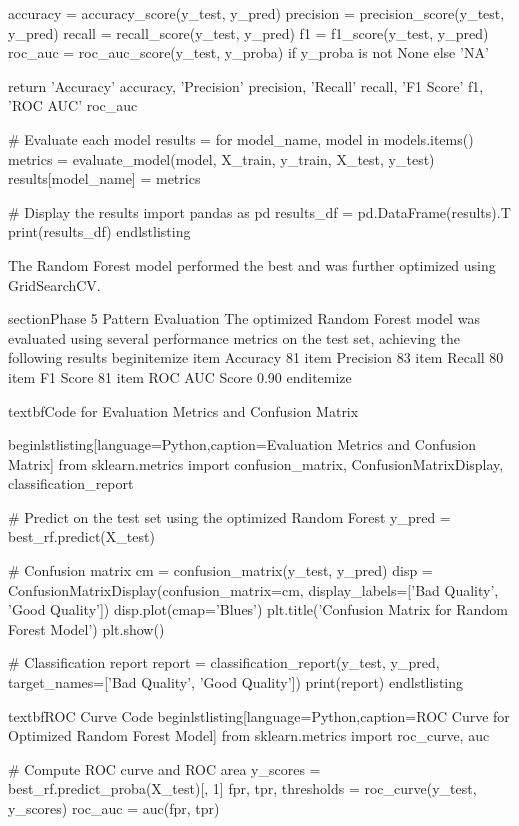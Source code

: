     accuracy = accuracy_score(y_test, y_pred)
    precision = precision_score(y_test, y_pred)
    recall = recall_score(y_test, y_pred)
    f1 = f1_score(y_test, y_pred)
    roc_auc = roc_auc_score(y_test, y_proba) if y_proba is not None else 'NA'

    return {
        'Accuracy' accuracy,
        'Precision' precision,
        'Recall' recall,
        'F1 Score' f1,
        'ROC AUC' roc_auc
    }

# Evaluate each model
results = {}
for model_name, model in models.items()
    metrics = evaluate_model(model, X_train, y_train, X_test, y_test)
    results[model_name] = metrics

# Display the results
import pandas as pd
results_df = pd.DataFrame(results).T
print(results_df)
end{lstlisting}

The Random Forest model performed the best and was further optimized using GridSearchCV.

section{Phase 5 Pattern Evaluation}
The optimized Random Forest model was evaluated using several performance metrics on the test set, achieving the following results
begin{itemize}
    item Accuracy 81%
    item Precision 83%
    item Recall 80%
    item F1 Score 81%
    item ROC AUC Score 0.90
end{itemize}

textbf{Code for Evaluation Metrics and Confusion Matrix}

begin{lstlisting}[language=Python,caption=Evaluation Metrics and Confusion Matrix]
from sklearn.metrics import confusion_matrix, ConfusionMatrixDisplay, classification_report

# Predict on the test set using the optimized Random Forest
y_pred = best_rf.predict(X_test)

# Confusion matrix
cm = confusion_matrix(y_test, y_pred)
disp = ConfusionMatrixDisplay(confusion_matrix=cm, display_labels=['Bad Quality', 'Good Quality'])
disp.plot(cmap='Blues')
plt.title('Confusion Matrix for Random Forest Model')
plt.show()

# Classification report
report = classification_report(y_test, y_pred, target_names=['Bad Quality', 'Good Quality'])
print(report)
end{lstlisting}

textbf{ROC Curve Code}
begin{lstlisting}[language=Python,caption=ROC Curve for Optimized Random Forest Model]
from sklearn.metrics import roc_curve, auc

# Compute ROC curve and ROC area
y_scores = best_rf.predict_proba(X_test)[, 1]
fpr, tpr, thresholds = roc_curve(y_test, y_scores)
roc_auc = auc(fpr, tpr)

